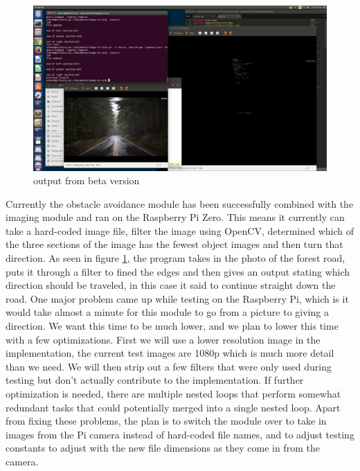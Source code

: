 \documentclass[10pt,letterpaper,onecolumn,draftclsnofoot,journal]{IEEEtran}
\begin{document}
\begin{figure}[H]
	\centering
	\includegraphics[scale = .25]{demo.png}
	\caption{output from beta version}
	\label{fig:beta}
\end{figure}
\par
Currently the obstacle avoidance module has been successfully combined with the imaging module and ran on the Raspberry Pi Zero. This means it currently can take a hard-coded image file, filter the image using OpenCV, determined which of the three sections of the image has the fewest object images and then turn that direction. As seen in figure \ref{fig:beta}, the program takes in the photo of the forest road, puts it through a filter to fined the edges and then gives an output stating which direction should be traveled, in this case it said to continue straight down the road. One major problem came up while testing on the Raspberry Pi, which is it would take almost a minute for this module to go from a picture to giving a direction. We want this time to be much lower, and we plan to lower this time with a few optimizations. First we will use a lower resolution image in the implementation, the current test images are 1080p which is much more detail than we need. We will then strip out a few filters that were only used during testing but don't actually contribute to the implementation. If further optimization is needed, there are multiple nested loops that perform somewhat redundant tasks that could potentially merged into a single nested loop. Apart from fixing these problems, the plan is to switch the module over to take in images from the Pi camera instead of hard-coded file names, and to adjust testing constants to adjust with the new file dimensions as they come in from the camera.
\end{document}
